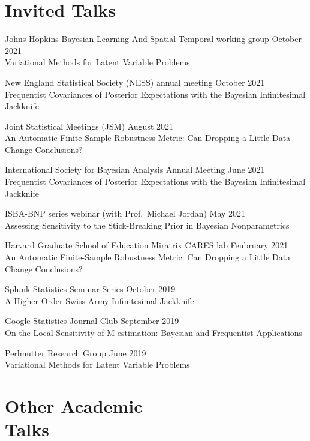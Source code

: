 \documentclass[margin,line]{res}
\begin{document}
\begin{resume}
\clearpage
\section{\sc Invited Talks}



Johns Hopkins Bayesian Learning And Spatial Temporal working group
\hfill October 2021\\
Variational Methods for Latent Variable Problems

New England Statistical Society (NESS) annual meeting
\hfill October 2021\\
Frequentist Covariances of Posterior Expectations
with the Bayesian Infinitesimal Jackknife

Joint Statistical Meetings (JSM)
\hfill August 2021\\
An Automatic Finite-Sample Robustness Metric: Can Dropping a Little Data
Change Conclusions?

International Society for Bayesian Analysis Annual Meeting
\hfill June 2021\\
Frequentist Covariances of Posterior Expectations
with the Bayesian Infinitesimal Jackknife

ISBA-BNP series webinar (with Prof.\ Michael Jordan)
\hfill May 2021\\
Assessing Sensitivity to the Stick-Breaking Prior in Bayesian Nonparametrics

Harvard Graduate School of Education Miratrix CARES lab
\hfill Feubruary 2021\\
An Automatic Finite-Sample Robustness Metric: Can Dropping a Little Data
Change Conclusions?

Splunk Statistics Seminar Series \hfill October 2019\\
A Higher-Order Swiss Army Infinitesimal Jackknife

Google Statistics Journal Club \hfill September 2019\\
On the Local Sensitivity of M-estimation: Bayesian and Frequentist Applications

Perlmutter Research Group \hfill June 2019 \\
Variational Methods for Latent Variable Problems



\section{\sc Other Academic\\Talks}


\end{resume}
\end{document}
